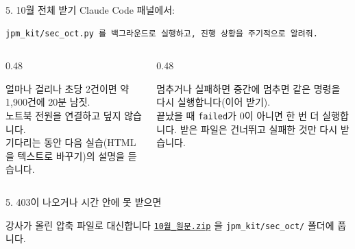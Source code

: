 \begin{frame}[fragile]{5. 10월 전체 받기}
\small
\noindent Claude Code 패널에서:
\begin{Verbatim}
jpm_kit/sec_oct.py 를 백그라운드로 실행하고, 진행 상황을 주기적으로 알려줘.
\end{Verbatim}
\vspace{0.3em}
\begin{columns}[T]
\begin{column}{0.48\textwidth}
\begin{block}{얼마나 걸리나}
초당 2건이면 \num{약 1,900건}에 \num{20분 남짓}.\\
노트북 전원을 연결하고 덮지 않습니다.\\
기다리는 동안 다음 실습(HTML을 텍스트로 바꾸기)의 설명을 듣습니다.
\end{block}
\end{column}
\begin{column}{0.48\textwidth}
\begin{block}{멈추거나 실패하면}
중간에 멈추면 같은 명령을 다시 실행합니다(이어 받기).\\
끝났을 때 \texttt{failed}가 0이 아니면 한 번 더 실행합니다. 받은 파일은 건너뛰고 실패한 것만 다시 받습니다.
\end{block}
\end{column}
\end{columns}
\end{frame}

\begin{frame}[fragile]{5. 403이 나오거나 시간 안에 못 받으면}
\begin{alertblock}{강사가 올린 압축 파일로 대신합니다}
\href{https://www.dropbox.com/scl/fi/a7njti2aj7789ccrj0cyw/10-_.zip?rlkey=tk8t7s50x2vsotvejaeh8vfit&dl=1}{\texttt{10월\_원문.zip}} 을 \texttt{jpm\_kit/sec\_oct/} 폴더에 풉니다.\\[2pt]
\end{alertblock}
\vspace{0.6em}
\centering
{}
\end{frame}

